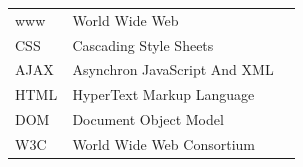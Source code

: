 \documentclass[a4paper,bibtotoc,oneside]{scrbook}
\begin{document}








\listoffigures
{} %
\newpage


\hspace{-17mm}\begin{tabular}{>{\raggedleft}p{0.2\linewidth} p{0.75\linewidth} p{0.1\linewidth}}

www & World Wide Web\\
CSS & Cascading Style Sheets\\
AJAX & Asynchron JavaScript And XML\\
HTML & HyperText Markup Language\\
DOM & Document Object Model\\
W3C & World Wide Web Consortium\\

\end{tabular}


\end{document}
